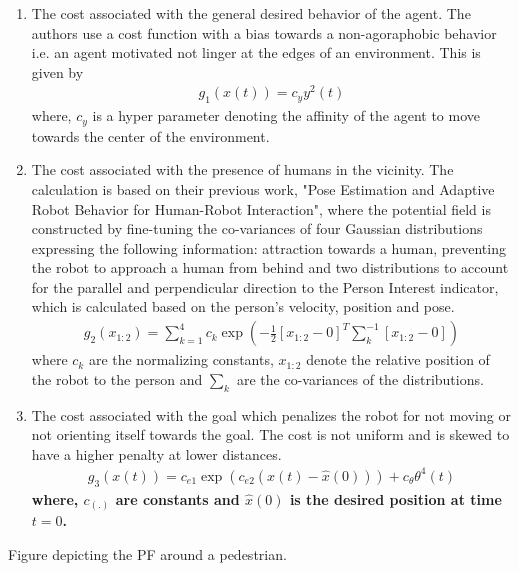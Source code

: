 \begin{enumerate}
\item The cost associated with the general desired behavior of the agent. The authors use a cost function with a bias towards a non-agoraphobic behavior i.e. an agent motivated not linger at the edges of an environment. This is given by
\begin{align}
g_{1}(x(t)) = c_{y}y^{2}(t)
\end{align}
where, $c_y$ is a hyper parameter denoting the affinity of the agent to move towards the center of the environment.
\item The cost associated with the presence of humans in the vicinity. The calculation is based on their previous work, "Pose Estimation and Adaptive Robot Behavior for Human-Robot Interaction", where the potential field is constructed by fine-tuning the co-variances of four Gaussian distributions expressing the following information: attraction towards a human, preventing the robot to approach a human from behind and two distributions to account for the parallel and perpendicular direction to the Person Interest indicator, which is calculated based on the person's velocity, position and pose.  
\begin{align}
g_{2}(x_{1:2}) = \sum_{k=1}^{4}c_{k}\exp(-\frac{1}{2}[x_{1:2} - 0]^{T}\sum^{-1}_{k}[x_{1:2} - 0])
\end{align} 
where $c_{k}$ are the normalizing constants, $x_{1:2}$ denote the relative position of the robot to the person and $\sum_k$ are the co-variances of the distributions.
\item The cost associated with the goal which penalizes the robot for not moving or not orienting itself towards the goal. The cost is not uniform and is skewed to have a higher penalty at lower distances.
\begin{align}
g_{3}(x(t)) = c_{e1}\exp(c_{e2}(x(t) - \hat{x}(0))) + c_{\theta}\theta^{4}(t)
\end{align}
\textbf{where, $c_{(.)}$ are constants and $\hat{x}(0)$ is the desired position at time $t=0$.}
\end{enumerate}

Figure depicting the PF around a pedestrian.

